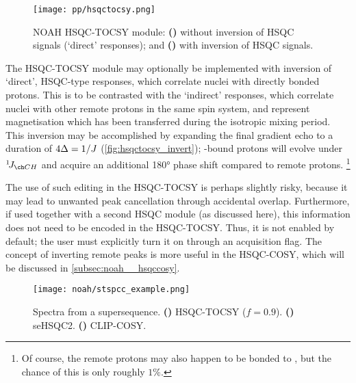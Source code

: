 \begin{figure}[!ht]
    \centering
    \texttt{[image: pp/hsqctocsy.png]}%
    {\label{fig:hsqctocsy_base}}%
    {\label{fig:hsqctocsy_invert}}%
    \caption[NOAH HSQC-TOCSY module]{
        NOAH HSQC-TOCSY module:
        \textbf{()} without inversion of HSQC signals (`direct' responses); and
        \textbf{()} with inversion of HSQC signals.
    }
    \label{fig:hsqctocsy}
\end{figure}

The HSQC-TOCSY module may optionally be implemented with inversion of `direct', HSQC-type responses, which correlate \carbon{} nuclei with directly bonded protons.
This is to be contrasted with the `indirect' responses, which correlate \carbon{} nuclei with other remote protons in the same spin system, and represent magnetisation which has been transferred during the isotropic mixing period.
This inversion may be accomplished by expanding the final gradient echo to a duration of $4\Delta = 1/J\/$ (\cref{fig:hsqctocsy_invert}); \carbon{}-bound protons will evolve under $\oneJ{CH}$ and acquire an additional \ang{180} phase shift compared to remote protons.%
\footnote{Of course, the remote protons may also happen to be bonded to \carbon{}, but the chance of this is only roughly $1\%$.}

The use of such editing in the HSQC-TOCSY is perhaps slightly risky, because it may lead to unwanted peak cancellation through accidental overlap.
Furthermore, if used together with a second HSQC module (as discussed here), this information does not need to be encoded in the HSQC-TOCSY.
Thus, it is not enabled by default; the user must explicitly turn it on through an acquisition flag.
The concept of inverting remote peaks is more useful in the HSQC-COSY, which will be discussed in \cref{subsec:noah__hsqccosy}.

\begin{figure}[!ht]
    \centering
    \texttt{[image: noah/stspcc\_example.png]}%
    {\label{fig:stspcc_example_st}}%
    {\label{fig:stspcc_example_sp}}%
    {\label{fig:stspcc_example_cc}}%
    \caption[Spectra from a  supersequence]{
        Spectra from a  supersequence.
        \textbf{()} HSQC-TOCSY ($f = 0.9$).
        \textbf{()} seHSQC2.
        \textbf{()} CLIP-COSY.
    }
    \label{fig:stspcc_example}
\end{figure}


